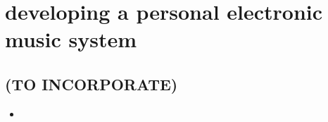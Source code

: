 \chapter{developing a personal electronic music system}\label{}








\begin{unsortedStuff}	
\section*{(TO INCORPORATE)}
	\begin{itemize}
		\item 
	\end{itemize}
\end{unsortedStuff}
		
\begin{optBlankSpace}
	\newpage
	\mbox{}
\end{optBlankSpace}

